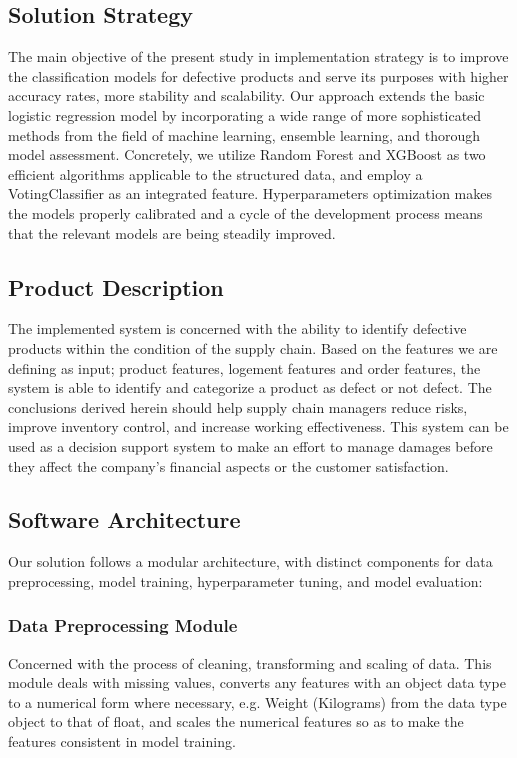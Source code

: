 \documentclass[conference]{IEEEtran}
\begin{document}
\subsection{Solution Strategy}
The main objective of the present study in implementation strategy is to improve the classification models for defective products and serve its purposes with higher accuracy rates, more stability and scalability. Our approach extends the basic logistic regression model by incorporating a wide range of more sophisticated methods from the field of machine learning, ensemble learning, and thorough model assessment. Concretely, we utilize Random Forest and XGBoost as two efficient algorithms applicable to the structured data, and employ a VotingClassifier as an integrated feature. Hyperparameters optimization makes the models properly calibrated and a cycle of the development process means that the relevant models are being steadily improved.

\subsection{Product Description}
The implemented system is concerned with the ability to identify defective products within the condition of the supply chain. Based on the features we are defining as input; product features, logement features and order features, the system is able to identify and categorize a product as defect or not defect. The conclusions derived herein should help supply chain managers reduce risks, improve inventory control, and increase working effectiveness. This system can be used as a decision support system to make an effort to manage damages before they affect the company’s financial aspects or the customer satisfaction.

\subsection{Software Architecture}
Our solution follows a modular architecture, with distinct components for data preprocessing, model training, hyperparameter tuning, and model evaluation:

\subsubsection{Data Preprocessing Module}
Concerned with the process of cleaning, transforming and scaling of data. This module deals with missing values, converts any features with an object data type to a numerical form where necessary, e.g. Weight (Kilograms) from the data type object to that of float, and scales the numerical features so as to make the features consistent in model training.
\end{document}
